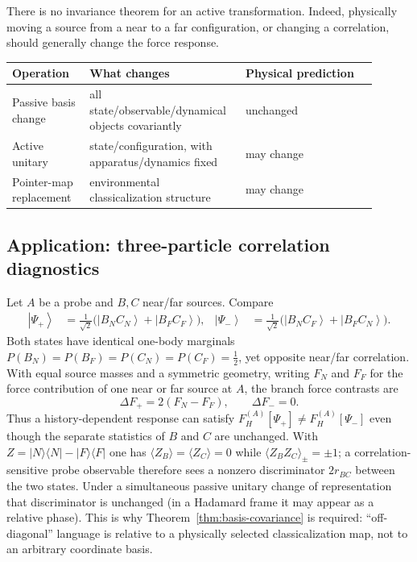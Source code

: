\documentclass[11pt]{article}
\theoremstyle{definition}
\theoremstyle{remark}
\newcommand{\ket}[1]{\left|#1\right\rangle}
\begin{document}
There is no invariance theorem for an active transformation. Indeed, physically moving a source from a near to a far configuration, or changing a correlation, should generally change the force response.

\begin{center}
\begin{tabular}{p{0.20\linewidth}p{0.36\linewidth}p{0.34\linewidth}}
\toprule
Operation & What changes & Physical prediction \\
\midrule
Passive basis change & all state/observable/dynamical objects covariantly & unchanged \\
Active unitary & state/configuration, with apparatus/dynamics fixed & may change \\
Pointer-map replacement & environmental classicalization structure & may change \\
\bottomrule
\end{tabular}
\end{center}

\subsection{Application: three-particle correlation diagnostics}
Let $A$ be a probe and $B,C$ near/far sources. Compare
\begin{align}
  \ket{\Psi_+}&=\frac{1}{\sqrt2}\bigl(\ket{B_NC_N}+\ket{B_FC_F}\bigr),&
  \ket{\Psi_-}&=\frac{1}{\sqrt2}\bigl(\ket{B_NC_F}+\ket{B_FC_N}\bigr).
\end{align}
Both states have identical one-body marginals $P(B_N)=P(B_F)=P(C_N)=P(C_F)=\tfrac12$, yet opposite near/far correlation.
With equal source masses and a symmetric geometry, writing $F_N$ and $F_F$ for the force contribution of one near or far source at $A$, the branch force contrasts are
\begin{equation}
  \Delta F_+=2(F_N-F_F),\qquad \Delta F_-=0.
\end{equation}
Thus a history-dependent response can satisfy $F_H^{(A)}[\Psi_+]\neq F_H^{(A)}[\Psi_-]$ even though the separate statistics of $B$ and $C$ are unchanged.
With $Z=|N\rangle\langle N|-|F\rangle\langle F|$ one has $\langle Z_B\rangle=\langle Z_C\rangle=0$ while $\langle Z_BZ_C\rangle_{\pm}=\pm1$; a correlation-sensitive probe observable therefore sees a nonzero discriminator $2r_{BC}$ between the two states.
Under a simultaneous passive unitary change of representation that discriminator is unchanged (in a Hadamard frame it may appear as a relative phase).
This is why Theorem~\ref{thm:basis-covariance} is required: ``off-diagonal'' language is relative to a physically selected classicalization map, not to an arbitrary coordinate basis.
\end{document}
